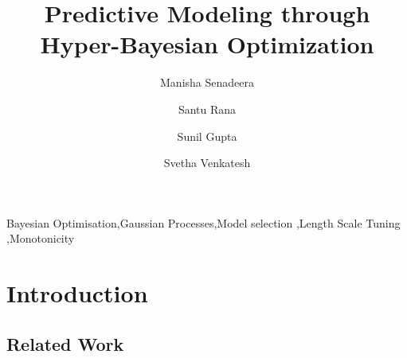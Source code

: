 \documentclass[review]{elsarticle}
\begin{document}
\begin{frontmatter}

\title{Predictive Modeling through Hyper-Bayesian Optimization}


\author[1]{Manisha Senadeera}
\author[1]{Santu Rana}
\author[1]{Sunil Gupta}
\author[1]{Svetha Venkatesh}

\address[1]{Deakin University, Applied Artificial Intelligence Institute, Geelong, Australia \\
75 Pigdons Rd, Waurn Ponds VIC 3216, Australia}





\begin{abstract}

\end{abstract}

\begin{keyword}
Bayesian Optimisation\sep Gaussian Processes\sep Model selection \sep Length Scale Tuning \sep Monotonicity
\end{keyword}

\end{frontmatter}


\section{Introduction}


\subsection{Related Work}

\end{document}
